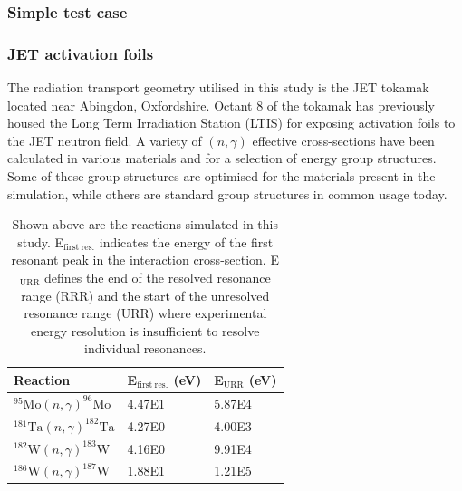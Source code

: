 \subsubsection{Simple test case}

\subsubsection{JET activation foils}

The radiation transport geometry utilised in this study is the JET tokamak located near Abingdon, Oxfordshire. Octant 8 of the tokamak has previously housed the Long Term Irradiation Station (LTIS) for exposing activation foils to the JET neutron field. A variety of $(n,\gamma)$ effective cross-sections have been calculated in various materials and for a selection of energy group structures. Some of these group structures are optimised for the materials present in the simulation, while others are standard group structures in common usage today. 

\begin{table}[h]
  \centering
  \begin{tabular}{lll}
    \toprule
    Reaction                                       & E$_\mathrm{first\ res.}$ (eV) & E$_\mathrm{URR}$ (eV) \\ 
    \midrule
    $^{95}\mathrm{Mo}(n,\gamma)^{96}\mathrm{Mo}$   & 4.47E1                        & 5.87E4                \\
    $^{181}\mathrm{Ta}(n,\gamma)^{182}\mathrm{Ta}$ & 4.27E0                        & 4.00E3                \\
    $^{182}\mathrm{W}(n,\gamma)^{183}\mathrm{W}$   & 4.16E0                        & 9.91E4                \\
    $^{186}\mathrm{W}(n,\gamma)^{187}\mathrm{W}$   & 1.88E1                        & 1.21E5                \\ 
    \bottomrule
  \end{tabular}
  \caption{Shown above are the reactions simulated in this study. E$_\mathrm{first\ res.}$ indicates the energy of the first resonant peak in the interaction cross-section. E$_\mathrm{URR}$ defines the end of the resolved resonance range (RRR) and the start of the unresolved resonance range (URR) where experimental energy resolution is insufficient to resolve individual resonances.}
  \label{tab:reactions}
\end{table}

